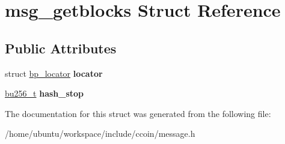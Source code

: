 \hypertarget{structmsg__getblocks}{\section{msg\-\_\-getblocks Struct Reference}
\label{structmsg__getblocks}
}
\subsection*{Public Attributes}
\begin{DoxyCompactItemize}
\item 
\hypertarget{structmsg__getblocks_acd3386c879d45cb757566cf77334f1e8}{struct \hyperlink{structbp__locator}{bp\-\_\-locator} {\bfseries locator}}\label{structmsg__getblocks_acd3386c879d45cb757566cf77334f1e8}

\item 
\hypertarget{structmsg__getblocks_aa4a5e3d8e4c1e307af25b932aa96df2d}{\hyperlink{structbu256}{bu256\-\_\-t} {\bfseries hash\-\_\-stop}}\label{structmsg__getblocks_aa4a5e3d8e4c1e307af25b932aa96df2d}

\end{DoxyCompactItemize}


The documentation for this struct was generated from the following file\-:\begin{DoxyCompactItemize}
\item 
/home/ubuntu/workspace/include/ccoin/message.\-h\end{DoxyCompactItemize}
